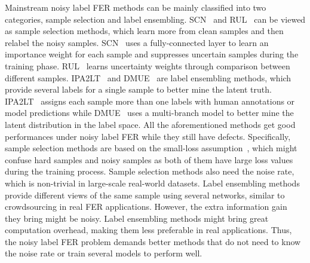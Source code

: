 \documentclass[runningheads]{llncs}
\begin{document}
Mainstream noisy label FER methods can be mainly classified into two categories, sample selection and label ensembling. SCN~\cite{wang2020suppressing} and RUL~\cite{zhang2021relative} can be viewed as sample selection methods, which learn more from clean samples and then relabel the noisy samples. SCN~\cite{wang2020suppressing} uses a fully-connected layer to learn an importance weight for each sample and suppresses uncertain samples during the training phase. RUL~\cite{zhang2021relative} learns uncertainty weights through comparison between different samples. IPA2LT~\cite{she2021dive} and DMUE~\cite{she2021dive} are label ensembling methods, which provide several labels for a single sample to better mine the latent truth. IPA2LT~\cite{she2021dive} assigns each sample more than one labels with human annotations or model predictions while DMUE~\cite{she2021dive} uses a multi-branch model to better mine the latent distribution in the label space. All the aforementioned methods get good performances under noisy label FER while they still have defects. Specifically, sample selection methods are based on the small-loss assumption~\cite{zhang2021understanding, arpit2017closer}, which might confuse hard samples and noisy samples as both of them have large loss values during the training process. Sample selection methods also need the noise rate, which is non-trivial in large-scale real-world datasets. Label ensembling methods provide different views of the same sample using several networks, similar to crowdsourcing in real FER applications. However, the extra information gain they bring might be noisy. Label ensembling methods might bring great computation overhead, making them less preferable in real applications. Thus, the noisy label FER problem demands better methods that do not need to know the noise rate or train several models to perform well.
\end{document}
